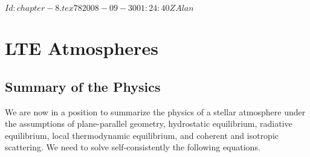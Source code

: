 
\svnInfo $Id: chapter-8.tex 78 2008-09-30 01:24:40Z Alan $

\chapter{LTE Atmospheres}

\section{Summary of the Physics}

We are now in a position to summarize the physics of a stellar atmosphere under the assumptions of plane-parallel geometry, hydrostatic equilibrium, radiative equilibrium, local thermodynamic equilibrium, and coherent and isotropic scattering. We need to solve self-consistently the following equations. 

\newslide

